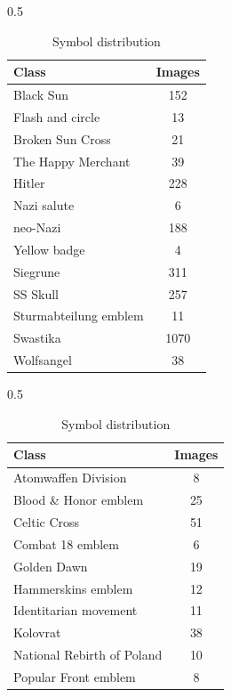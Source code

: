 
\begin{table}[ht]
  \begin{subtable}[c]{0.5\textwidth}
    \centering
    \begin{tabular}{lc}
      \toprule
      \textbf{Class}        & \textbf{Images} \\
      \midrule
      Black Sun             & 152             \\
      Flash and circle      & 13              \\
      Broken Sun Cross      & 21              \\
      The Happy Merchant    & 39              \\
      Hitler                & 228             \\
      Nazi salute           & 6               \\
      neo-Nazi              & 188             \\
      Yellow badge          & 4               \\
      Siegrune              & 311             \\
      SS Skull              & 257             \\
      Sturmabteilung emblem & 11              \\
      Swastika              & 1070            \\
      Wolfsangel            & 38              \\
      \bottomrule
    \end{tabular}
  \end{subtable}
\hfill
  \begin{subtable}[c]{0.5\textwidth}
    \centering
    \begin{tabular}{lc}
      \toprule
      \textbf{Class}             & \textbf{Images} \\
      \midrule
      Atomwaffen Division        & 8               \\
      Blood \& Honor emblem      & 25             \\
      Celtic Cross               & 51              \\
      Combat 18 emblem           & 6               \\
      Golden Dawn                & 19              \\
      Hammerskins emblem         & 12              \\
      Identitarian movement      & 11              \\
      Kolovrat                   & 38              \\
      National Rebirth of Poland & 10              \\
      Popular Front emblem       & 8               \\
      \bottomrule
    \end{tabular}
  \end{subtable}

  \caption{Symbol distribution}
  \label{tab:symbol-distribution}
\end{table}